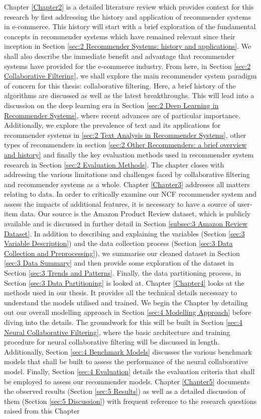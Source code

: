 Chapter \ref{Chapter2} is a detailed literature review which provides context for this research by first addressing the history and application of recommender systems in e-commerce. This history will start with a brief exploration of the fundamental concepts in recommender systems which have remained relevant since their inception in Section \ref{sec:2 Recommender Systems: history and applications}. We shall also describe the immediate benefit and advantage that recommender systems have provided for the e-commerce industry. From here, in Section \ref{sec:2 Collaborative Filtering}, we shall explore the main recommender system paradigm of concern for this thesis: collaborative filtering. Here, a brief history of the algorithms are discussed as well as the latest breakthroughs. This will lead into a discussion on the deep learning era in Section \ref{sec:2 Deep Learning in Recommender Systems}, where recent advances are of particular importance. Additionally, we explore the prevalence of text and its applications for recommender systems in \ref{sec:2 Text Analysis in Recommender Systems}, other types of recommenders in section \ref{sec:2 Other Recommenders: a brief overview and history} and finally the key evaluation methods used in recommender system research in Section \ref{sec:2 Evaluation Methods}. The chapter closes with addressing the various limitations and challenges faced by collaborative filtering and recommender systems as a whole. Chapter \ref{Chapter3} addresses all matters relating to data. In order to critically examine our NCF recommender system and assess the impacts of additional features, it is necessary to have a source of user-item data. Our source is the Amazon Product Review dataset, which is publicly available and is discussed in further detail in Section \ref{subsec:3 Amazon Review Dataset}. In addition to describing and explaining the variables (Section \ref{sec:3 Variable Description}) and the data collection process (Section \ref{sec:3 Data Collection and Preprocessing}), we summarise our cleaned dataset in Section \ref{sec:3 Data Summary} and then provide some exploration of the dataset in Section \ref{sec:3 Trends and Patterns}. Finally, the data partitioning process, in Section \ref{sec:3 Data Partitioning} is looked at. Chapter \ref{Chapter4} looks at the methods used in our thesis. It provides all the technical details necessary to understand the models utilised and trained. We begin the Chapter by detailing out our overall modelling approach in Section \ref{sec:4 Modelling Approach} before diving into the details. The groundwork for this will be built in Section \ref{sec:4 Neural Collaborative Filtering}, where the basic architecture and training procedure for neural collaborative filtering will be discussed in length. Additionally, Section \ref{sec:4 Benchmark Models} discusses the various benchmark models that shall be built to assess the performance of the neural collaborative model. Finally, Section \ref{sec:4 Evaluation} details the evaluation criteria that shall be employed to assess our recommender models. Chapter \ref{Chapter5} documents the observed results (Section \ref{sec:5 Results}) as well as a detailed discussion of them (Section \ref{sec:5 Discussion}) with frequent reference to the research questions raised from this Chapter 